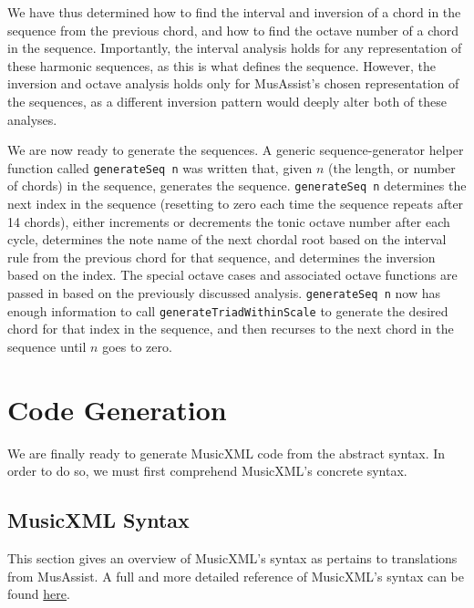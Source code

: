 \documentclass{report}
\begin{document}
We have thus determined how to find the interval and inversion of a chord in the sequence from the previous chord, and how to find the octave number of a chord in the sequence. Importantly, the interval analysis holds for any representation of these harmonic sequences, as this is what defines the sequence. However, the inversion and octave analysis holds only for MusAssist's chosen representation of the sequences, as a different inversion pattern would deeply alter both of these analyses.

We are now ready to generate the sequences. A generic sequence-generator helper function called \verb.generateSeq n. was written that, given $n$ (the length, or number of chords) in the sequence, generates the sequence. \verb.generateSeq n. determines the next index  in the sequence (resetting to zero each  time the sequence repeats after 14 chords), either  increments or decrements the tonic octave number after each cycle, determines the note name of the next chordal root based on the interval rule from the previous chord for that sequence, and determines the inversion based on the index. The special octave cases and associated octave functions are passed in based on the previously discussed analysis. \verb.generateSeq n. now has enough information to call  \verb.generateTriadWithinScale. to generate the desired chord for that index in the sequence, and then recurses to the next chord in the sequence until $n$ goes to zero. 

\chapter{Code Generation}
\label{chap:codegen}
We are finally ready to generate MusicXML code from the abstract syntax. In order to do so, we must first comprehend MusicXML's concrete syntax. 

\section{MusicXML Syntax}
This section gives an overview of MusicXML's syntax as pertains to translations from MusAssist. A full and more detailed reference of MusicXML's syntax can be found \href{https://www.w3.org/2021/06/musicxml40/}{here}.
\end{document}
